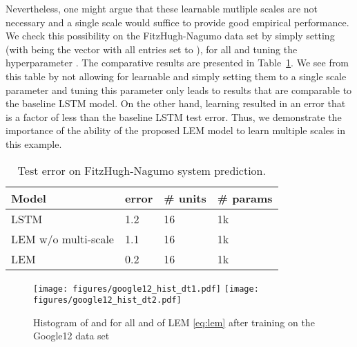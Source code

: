 \documentclass{article} \usepackage{iclr2022_conference,times}
\newcommand{\Tref}[1]{Table~\ref{#1}}
\begin{document}
Nevertheless, one might argue that these learnable mutliple scales  are not necessary and a single scale would suffice to provide good empirical performance. We check this possibility on the FitzHugh-Nagumo data set by simply setting  (with  being the vector with all entries set to ), for all  and tuning the hyperparameter . The comparative results are presented in \Tref{tab:FHN_wo_ms}. We see from this table by not allowing for learnable  and simply setting them to a single scale parameter  and tuning this parameter only leads to results that are comparable to the baseline LSTM model. On the other hand, learning  resulted in an error that is a factor of  less than the baseline LSTM test error. Thus, we demonstrate the importance of the ability of the proposed LEM model to learn multiple scales in this example.  
\begin{table}[h!]
\caption{Test  error on FitzHugh-Nagumo system prediction.}
\label{tab:FHN_wo_ms}
\centering
\begin{tabular}{llll}
\toprule
\cmidrule(r){1-4}
Model &  error  & \# units & \# params \\
\midrule
LSTM & 1.2 & 16 & 1k  \\
LEM w/o multi-scale & 1.1 & 16 & 1k \\
LEM & 0.2 & 16 & 1k  \\
    \bottomrule
  \end{tabular}
\end{table}

\begin{figure}[ht!]
\centering
\texttt{[image: figures/google12\_hist\_dt1.pdf]}
\texttt{[image: figures/google12\_hist\_dt2.pdf]}
\caption{Histogram of  and  for all  and  of LEM \eqref{eq:lem} after training on the Google12 data set}
\label{fig:g12_hist}
\end{figure}
\end{document}
